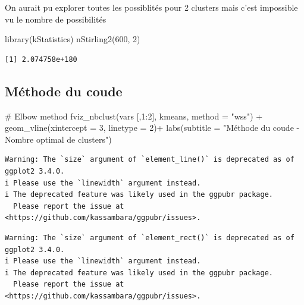\documentclass[
  french,
  letterpaper,
  DIV=11,
  numbers=noendperiod]{scrartcl}
\newenvironment{Shaded}{\begin{snugshade}}{\end{snugshade}}
\newcommand{\AttributeTok}[1]{\textcolor[rgb]{0.40,0.45,0.13}{#1}}
\newcommand{\CommentTok}[1]{\textcolor[rgb]{0.37,0.37,0.37}{#1}}
\newcommand{\DecValTok}[1]{\textcolor[rgb]{0.68,0.00,0.00}{#1}}
\newcommand{\FunctionTok}[1]{\textcolor[rgb]{0.28,0.35,0.67}{#1}}
\newcommand{\NormalTok}[1]{\textcolor[rgb]{0.00,0.23,0.31}{#1}}
\newcommand{\SpecialCharTok}[1]{\textcolor[rgb]{0.37,0.37,0.37}{#1}}
\newcommand{\StringTok}[1]{\textcolor[rgb]{0.13,0.47,0.30}{#1}}
\begin{document}
On aurait pu explorer toutes les possiblités pour 2 clusters mais c'est
impossible vu le nombre de possibilités

\begin{Shaded}
\begin{Highlighting}[]
\FunctionTok{library}\NormalTok{(kStatistics)}
\FunctionTok{nStirling2}\NormalTok{(}\DecValTok{600}\NormalTok{, }\DecValTok{2}\NormalTok{)}
\end{Highlighting}
\end{Shaded}

\begin{verbatim}
[1] 2.074758e+180
\end{verbatim}

\subsection{Méthode du coude}\label{muxe9thode-du-coude}

\begin{Shaded}
\begin{Highlighting}[]
\CommentTok{\# Elbow method}
\FunctionTok{fviz\_nbclust}\NormalTok{(vars [,}\DecValTok{1}\SpecialCharTok{:}\DecValTok{2}\NormalTok{], kmeans, }\AttributeTok{method =} \StringTok{"wss"}\NormalTok{) }\SpecialCharTok{+}
    \FunctionTok{geom\_vline}\NormalTok{(}\AttributeTok{xintercept =} \DecValTok{3}\NormalTok{, }\AttributeTok{linetype =} \DecValTok{2}\NormalTok{)}\SpecialCharTok{+}
  \FunctionTok{labs}\NormalTok{(}\AttributeTok{subtitle =} \StringTok{"Méthode du coude {-} Nombre optimal de clusters"}\NormalTok{) }
\end{Highlighting}
\end{Shaded}

\begin{verbatim}
Warning: The `size` argument of `element_line()` is deprecated as of ggplot2 3.4.0.
i Please use the `linewidth` argument instead.
i The deprecated feature was likely used in the ggpubr package.
  Please report the issue at <https://github.com/kassambara/ggpubr/issues>.
\end{verbatim}

\begin{verbatim}
Warning: The `size` argument of `element_rect()` is deprecated as of ggplot2 3.4.0.
i Please use the `linewidth` argument instead.
i The deprecated feature was likely used in the ggpubr package.
  Please report the issue at <https://github.com/kassambara/ggpubr/issues>.
\end{verbatim}
\end{document}
